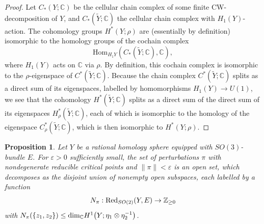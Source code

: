 \documentclass{memo-l}
\newtheorem{proposition}[theorem]{Proposition}
\theoremstyle{definition}
\theoremstyle{remark}
\numberwithin{section}{chapter}
\numberwithin{equation}{chapter}
\begin{document}
\begin{proof}Let $C_*(Y; \mathbb C)$ be the cellular chain complex of some finite CW-decomposition of $Y$, and $C_*(\tilde Y; \mathbb C)$ the cellular chain complex with $H_1(Y)$-action. The cohomology groups $H^*(Y; \rho)$ are (essentially by definition) isomorphic to the homology groups of the cochain complex 
$$\text{Hom}_{H_1 Y}\left(C_*(\tilde Y; \mathbb C), \mathbb C\right),$$
where $H_1(Y)$ acts on $\mathbb C$ via $\rho$. By definition, this cochain complex is isomorphic to the $\rho$-eigenspace of $C^*(\tilde Y; \mathbb C)$. Because the chain complex $C^*(\tilde Y; \mathbb C)$ splits as a direct sum of its eigenspaces, labelled by homomorphisms $H_1(Y) \to U(1)$, we see that the cohomology $H^*(\tilde Y; \mathbb C)$ splits as a direct sum of the direct sum of its eigenspaces $H^*_\rho(\tilde Y; \mathbb C)$, each of which is isomorphic to the homology of the eigenspace $C^*_\rho(\tilde Y; \mathbb C)$, which is then isomorphic to $H^*(Y; \rho)$.
\end{proof}

\begin{proposition}\label{Eigencounting}Let $Y$ be a rational homology sphere equipped with $SO(3)$-bundle $E$. For $\varepsilon > 0$ sufficiently small, the set of perturbations $\pi$ with nondegenerate reducible critical points and $\|\pi\| < \varepsilon$ is an open set, which decomposes as the disjoint union of nonempty open subspaces, each labelled by a function $$N_\pi: \textup{Red}_{SO(2)}(Y,E) \to \mathbb Z_{\geq 0}$$ with $N_\pi(\{z_1, z_2\}) \leq \textup{dim}_{\mathbb C } H^1\!\left(Y; \eta_1 \otimes \eta_2^{-1}\right)$.
\end{proposition}
\end{document}
